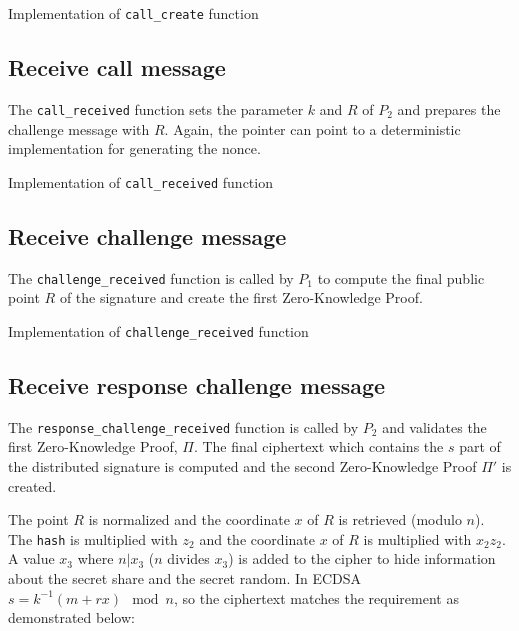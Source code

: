 \begin{longlisting}
	\caption{Implementation of \texttt{call\_create} function}
	\label{lst:implCallCreateFunc}
\end{longlisting}

\subsection{Receive call message}

The \texttt{call\_received} function sets the parameter $k$ and $R$ of $P_2$ and
prepares the challenge message with $R$. Again, the pointer can point to a
deterministic implementation for generating the nonce.

\begin{longlisting}
	\caption{Implementation of \texttt{call\_received} function}
	\label{lst:implCallReceivedFunc}
\end{longlisting}

\subsection{Receive challenge message}

The \texttt{challenge\_received} function is called by $P_1$ to compute the
final public point $R$ of the signature and create the first Zero-Knowledge
Proof.

\begin{longlisting}
	\caption{Implementation of \texttt{challenge\_received} function}
	\label{lst:implChallengeReceivedFunc}
\end{longlisting}

\subsection{Receive response challenge message}

The \texttt{response\_challenge\_received} function is called by $P_2$ and
validates the first Zero-Knowledge Proof, $\Pi$. The final ciphertext which
contains the $s$ part of the distributed signature is computed and the second
Zero-Knowledge Proof $\Pi'$ is created.

The point $R$ is normalized and the coordinate $x$ of $R$ is retrieved (modulo $n$). The
\texttt{hash} is multiplied with $z_2$ and the coordinate $x$ of $R$ is multiplied
with $x_2z_2$. A value $x_3$ where $n|x_3$ ($n$ divides $x_3$) is added to the cipher to hide
information about the secret share and the secret random. In ECDSA $s = k^{-1}(m +
rx) \mod n$, so the ciphertext matches the requirement as demonstrated below:

